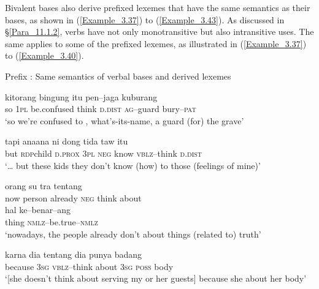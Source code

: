 Bivalent bases also derive prefixed lexemes that have the same semantics as their bases, as shown in (\ref{Example_3.37}) to (\ref{Example_3.43}). As discussed in §\ref{Para_11.1.2},  verbs have not only monotransitive but also intransitive uses. The same applies to some of the prefixed lexemes, as illustrated in (\ref{Example_3.37}) to (\ref{Example_3.40}).



\begin{styleExampleTitle}
{Prefix : Same semantics of verbal bases and derived lexemes}
\end{styleExampleTitle}

\ea
\label{Example_3.37}
 {kitorang} {bingung} {} {itu} {pen–jaga} {kuburang}\\ %
 so  \textsc{1pl}  be.confused  think  \textsc{d.dist}  \textsc{ag}–guard  bury–\textsc{pat}\\
\glt 
‘so we’re confused to , what’s-its-name, a guard (for) the grave’ \textstyleExampleSource{[080923-007-Cv.0024]}
\z

\ea
\label{Example_3.38}
\gll   {\ldots}  tapi  ana{\Tilde}ana  ni  dong  tida  taw    itu\\
  { }  but  \textsc{rdp}{\Tilde}child  \textsc{d.prox}  \textsc{3pl}  \textsc{neg}  know  \textsc{vblz}–think  \textsc{d.dist}\\
 ‘{\ldots} but these kids they don’t know (how) to  those (feelings of mine)’ \textstyleExampleSource{[081115-001b-Cv.0037]}
\z

\ea
\label{Example_3.39}
  orang  su  tra    tentang\\
 {now}  person  already  \textsc{neg}  think  about\\
\gll hal  {ke–benar–ang}\\
 thing  {\textsc{nmlz}–be.true–\textsc{nmlz}}\\
\glt 
‘nowadays, the people already don’t  about things (related to) truth’ \textstyleExampleSource{[081006-032-Cv.0016]}
\z

\ea
\label{Example_3.40}
\gll {\ldots} {karna} {dia} {} {tentang} {dia} {punya} {badang}\\ %
 { }  because  \textsc{3sg}  \textsc{vblz}–think  about  \textsc{3sg}  \textsc{poss}  body\\
\glt 
‘[she doesn’t think about serving my or her guests] because she  about her body’ \textstyleExampleSource{[081006-032-Cv.0062]}
\z


